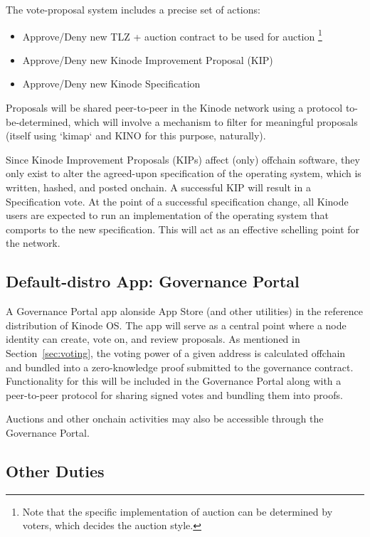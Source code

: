 \documentclass[runningheads]{llncs}
\begin{document}
The vote-proposal system includes a precise set of actions:
\begin{itemize}
    \item Approve/Deny new TLZ + auction contract to be used for auction
    \footnote{Note that the specific implementation of auction can be determined by voters, which decides the auction style.}
    \item Approve/Deny new Kinode Improvement Proposal (KIP)
    \item Approve/Deny new Kinode Specification
\end{itemize}

Proposals will be shared peer-to-peer in the Kinode network using a protocol to-be-determined, which will involve a mechanism to filter for meaningful proposals (itself using `kimap` and KINO for this purpose, naturally).

Since Kinode Improvement Proposals (KIPs) affect (only) offchain software, they only exist to alter the agreed-upon specification of the operating system, which is written, hashed, and posted onchain.
A successful KIP will result in a Specification vote.
At the point of a successful specification change, all Kinode users are expected to run an implementation of the operating system that comports to the new specification.
This will act as an effective schelling point for the network.

\subsection{Default-distro App: Governance Portal}
\label{sec:daoportal}

A Governance Portal app alonside App Store (and other utilities) in the reference distribution of Kinode OS.
The app will serve as a central point where a node identity can create, vote on, and review proposals.
As mentioned in Section~\ref{sec:voting}, the voting power of a given address is calculated offchain and bundled into a zero-knowledge proof submitted to the governance contract.
Functionality for this will be included in the Governance Portal along with a peer-to-peer protocol for sharing signed votes and bundling them into proofs.

Auctions and other onchain activities may also be accessible through the Governance Portal.

\subsection{Other Duties}
\label{sec:daoduties}
\end{document}
